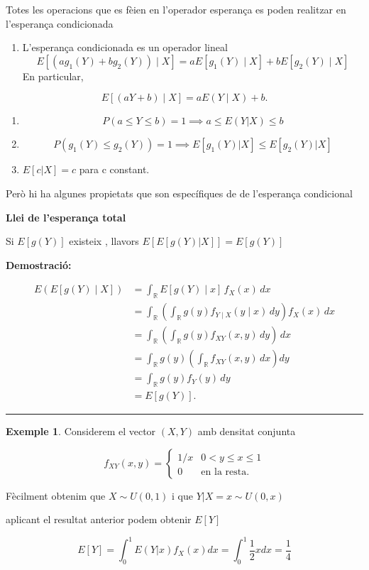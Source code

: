 \documentclass[
  catalan,
]{article}
\providecommand{\tightlist}{%
  \setlength{\itemsep}{0pt}\setlength{\parskip}{0pt}}
\theoremstyle{definition}
\theoremstyle{definition}
\newtheorem{example}{Exemple}[section]
\theoremstyle{definition}
\theoremstyle{definition}
\theoremstyle{remark}
\begin{document}
Totes les operacions que es fèien en l'operador esperança es poden realitzar en l'esperança condicionada

\begin{enumerate}
\def\labelenumi{\arabic{enumi}.}
\tightlist
\item
  L'esperança condicionada es un operador lineal
  \[
  E[(a g_1(Y)+b g_2(Y))\mid X]=aE[g_1(Y)\mid X]+bE[g_2(Y)\mid X] \label{eq:expcondlineal} 
  \]
  En particular,
\end{enumerate}

\[
E[(aY+b)\mid X]=aE(Y\mid X)+b. 
\]

\begin{enumerate}
\def\labelenumi{\arabic{enumi}.}
\setcounter{enumi}{1}
\tightlist
\item
  \[
  P(a \leq Y \leq b) = 1 \implies a \leq E(Y|X) \leq b \label{eq:expcondinterval}
  \]
\item
  \[
  P(g_1(Y) \leq g_2(Y)) = 1 \implies E[g_1(Y)|X] \leq E[g_2(Y)|X] \label{eq:expconddesigual}
  \]
\item
  \(E[c|X]=c\) para c constant. \label{eq:expcondconstant}
\end{enumerate}

Però hi ha algunes propietats que son específiques de de l'esperança condicional

\textbf{Llei de l'esperança total}

Si \(E[g(Y)]\) existeix , llavors \(E[E[g(Y)|X]]=E[g(Y)]\)

\textbf{Demostració:}

\[
\begin{aligned}
E(E[g(Y)\mid X])
&= \int_{\mathbb{R}} E[g(Y)\mid x]\,f_X(x)\,dx \\
&= \int_{\mathbb{R}}
\left(\int_{\mathbb{R}} g(y)f_{Y\mid X}(y\mid x)\,dy\right)
f_X(x)\,dx \\
&= \int_{\mathbb{R}}
\left(\int_{\mathbb{R}} g(y)f_{XY}(x,y)\,dy\right)\,dx \\
&= \int_{\mathbb{R}} g(y)
\left(\int_{\mathbb{R}} f_{XY}(x,y)\,dx\right)dy \\
&= \int_{\mathbb{R}} g(y)f_Y(y)\,dy \\
&= E[g(Y)].
\end{aligned}
\]

\begin{center}\rule{0.5\linewidth}{0.5pt}\end{center}

\begin{example}
Considerem el vector \((X,Y)\) amb densitat conjunta

\[
f_{XY}(x,y)=
\begin{cases}
1/x
& 0 <y \leq x \leq 1 \\
0
& \text{en la resta}.
\end{cases}
\]

Fècilment obtenim que \(X \sim U(0,1)\) i que \(Y|X=x \sim U(0,x)\)

aplicant el resultat anterior podem obtenir \(E[Y]\)

\[
E[Y]= \int_0^1 E(Y|x)f_X(x) dx= \int_0^1 \frac{1}{2} xdx=\frac{1}{4}
\]
\end{example}
\end{document}
